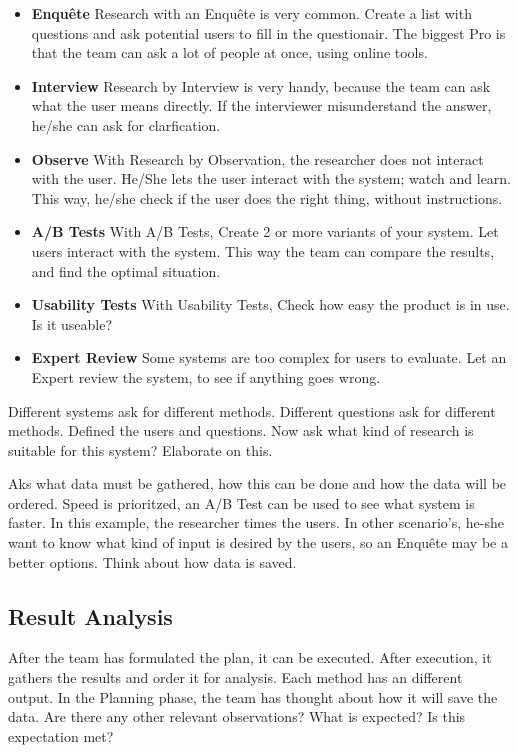 \documentclass[10pt]{report}
\begin{document}
\begin{itemize}
	\item \textbf{Enquête} Research with an Enquête is very common. Create a list with questions and ask potential users to fill in the questionair. The biggest Pro is that the team can ask a lot of people at once, using online tools.
	\item \textbf{Interview} Research by Interview is very handy, because the team can ask what the user means directly. If the interviewer misunderstand the answer, he/she can ask for clarfication.
	\item \textbf{Observe} With Research by Observation, the researcher does not interact with the user. He/She lets the user interact with the system; watch and learn. This way, he/she check if the user does the right thing, without instructions.
	\item \textbf{A/B Tests} With A/B Tests, Create 2 or more variants of your system. Let users interact with the system. This way the team can compare the results, and find the optimal situation.
	\item \textbf{Usability Tests} With Usability Tests, Check how easy the product is in use. Is it useable?
	\item \textbf{Expert Review} Some systems are too complex for users to evaluate. Let an Expert review the system, to see if anything goes wrong.
\end{itemize}

\noindent Different systems ask for different methods. Different questions ask for different methods. Defined the users and questions. Now ask what kind of research is suitable for this system? Elaborate on this.

Aks what data must be gathered, how this can be done and how the data will be ordered. Speed is prioritzed, an A/B Test can be used to see what system is faster. In this example, the researcher times the users. In other scenario's, he-she want to know what kind of input is desired by the users, so an Enquête may be a better options. Think about how data is saved.

\subsection{Result Analysis}

After the team has formulated the plan, it can be executed. After execution, it gathers the results and order it for analysis. Each method has an different output. In the Planning phase, the team has thought about how it will save the data. Are there any other relevant observations? What is expected? Is this expectation met?
\end{document}
